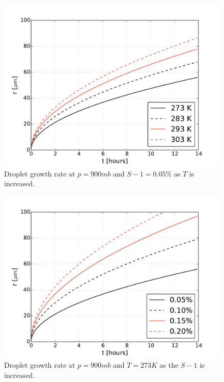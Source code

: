 \documentclass[titlepage]{article}
\begin{document}
\begin{figure}
    \centering
    \includegraphics[width=\textwidth]{r_t_temperature.pdf}
    \caption{Droplet growth rate at $p=900 mb$ and $S - 1 = 0.05\%$ as $T$ is increased.}
    \label{fig:temperature}
\end{figure}


\begin{figure}
    \centering
    \includegraphics[width=\textwidth]{r_t_supersaturation.pdf}
    \caption{Droplet growth rate at $p=900 mb$ and $T= 273 K$ as the $S - 1$ is increased.}
    \label{fig:supersaturation}
\end{figure}


\end{document}
